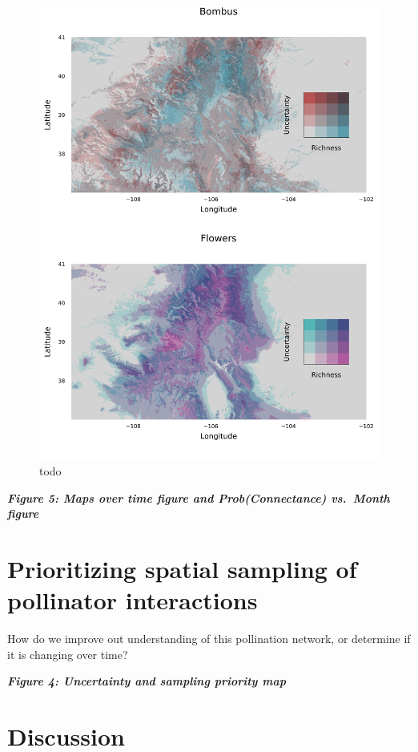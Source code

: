 \documentclass[11pt]{article}
\makeatletter
\def\maxwidth{\ifdim\Gin@nat@width>\linewidth\linewidth
\else\Gin@nat@width\fi}
\let\Oldincludegraphics\includegraphics
\renewcommand{\includegraphics}[1]{\Oldincludegraphics[width=\maxwidth]{#1}}
\makeatother
\begin{document}
\begin{figure}
\centering
\includegraphics{./figures/ssdms.png}
\caption{todo}
\end{figure}

\textbf{\emph{Figure 5: Maps over time figure and Prob(Connectance)
vs.~Month figure}}

\hypertarget{prioritizing-spatial-sampling-of-pollinator-interactions}{%
\section{Prioritizing spatial sampling of pollinator
interactions}\label{prioritizing-spatial-sampling-of-pollinator-interactions}}

How do we improve out understanding of this pollination network, or
determine if it is changing over time?

\textbf{\emph{Figure 4: Uncertainty and sampling priority map}}

\hypertarget{discussion}{%
\section{Discussion}\label{discussion}}
\end{document}
